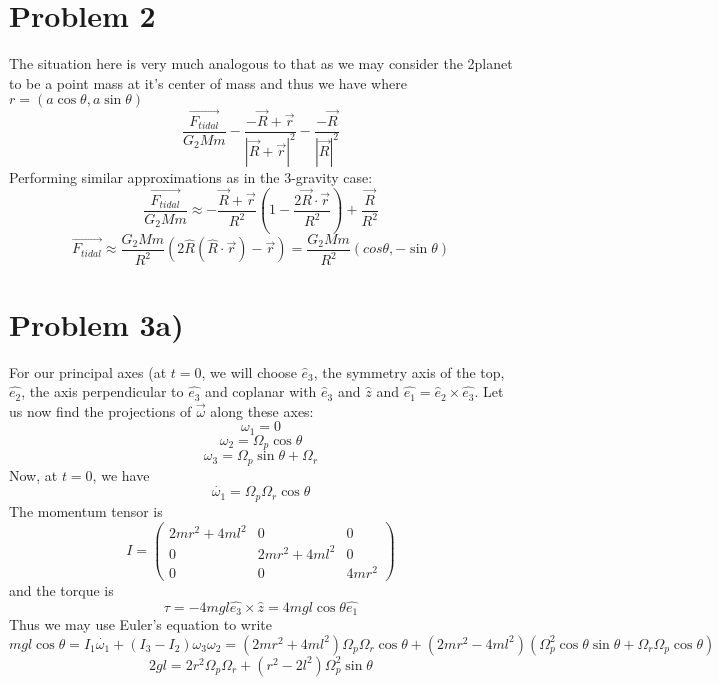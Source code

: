 \section*{Problem 2}
The situation here is very much analogous to that as we may consider the 2planet to be a point mass at it's center of mass and thus we have where $r=(a\cos\theta, a\sin\theta)$
\[ \frac{\vec{F_{tidal}}}{G_2Mm} - \frac{-\vec{R}+\vec{r}}{|\vec{R}+\vec{r}|^2}-\frac{-\vec{R}}{|\vec{R}|^2} \]
Performing similar approximations as in the 3-gravity case:
\[ \frac{\vec{F_{tidal}}}{G_2Mm} \approx -\frac{\vec{R}+\vec{r}}{R^2}\left(1-\frac{2\vec{R}\cdot\vec{r}}{R^2}\right)+\frac{\vec{R}}{R^2}\]
\[ \vec{F_{tidal}} \approx \frac{G_2Mm}{R^2}(2\hat{R}(\hat{R}\cdot \vec{r}) - \vec{r}) = \frac{G_2Mm}{R^2} (cos\theta,-\sin\theta) \]
\section*{Problem 3a)}
For our principal axes (at $t=0$, we will choose $\hat{e}_3$, the symmetry axis of the top, $\hat{e_2}$, the axis perpendicular to $\hat{e_3}$ and coplanar with $\hat{e}_3$ and $\hat{z}$ and $\hat{e_1} = \hat{e}_2\times \hat{e_3}$. Let us now find the projections of $\vec{\omega}$ along these axes:
\[ \omega_1 = 0 \]
\[ \omega_2 = \Omega_p\cos\theta \]
\[ \omega_3 = \Omega_p\sin\theta + \Omega_r\]
Now, at $t=0$, we have
\[ \dot{\omega_1} = \Omega_p\Omega_r\cos \theta \]
The momentum tensor is 
\[
I = \begin{pmatrix}
2mr^2+4ml^2&0&0\\
0&2mr^2+4ml^2&0\\
0&0&4mr^2
\end{pmatrix}
\]
and the torque is
\[ \tau = -4mgl \hat{e_3}\times\hat{z} = 4mgl \cos\theta \hat{e_1} \]
Thus we may use Euler's equation to write
\[ mgl\cos\theta = I_1 \dot{\omega_1} + (I_3-I_2)\omega_3\omega_2 = (2mr^2 + 4ml^2) \Omega_p \Omega_r \cos \theta + (2mr^2 - 4ml^2)(\Omega_p^2\cos\theta\sin\theta + \Omega_r\Omega_p \cos\theta) \]
\[ 2gl = 2r^2\Omega_p\Omega_r + (r^2-2l^2)\Omega_p^2\sin\theta \]
